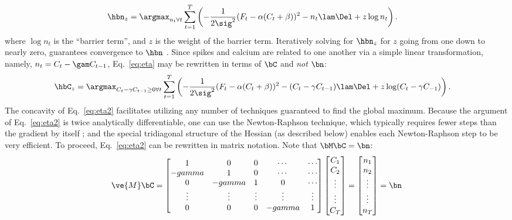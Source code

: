 \begin{align} \label{eq:eta}
\hbn_{\zzz} &= \argmax_{n_t \forall t}  \sum_{t=1}^T \left( -\frac{1}{2 \sig^2}(F_t - \alpha(C_t + \beta))^2  -  n_t  \lam \Del + \zzz \log n_t \right).
\end{align}
\noindent where $\log n_t$ is the ``barrier term'', and $z$ is the weight of the barrier term.  Iteratively solving for $\hbn_{\zzz}$ for $z$ going from one down to nearly zero, guarantees convergence to $\hbn$ \cite{CONV04}. Since spikes and calcium are related to one another via a simple linear transformation, namely, $n_t=C_t-\gam C_{t-1}$, Eq.~\eqref{eq:eta} may be rewritten in terms of $\bC$ and \emph{not} $\bn$:
\begin{align} 
\hbC_{\zzz} &= \argmax_{C_t - \gamma C_{t-1} \geq 0 \forall t} \sum_{t=1}^{T} \left( -\frac{1}{2 \sig^2} (F_t -\alpha (C_t + \beta))^2  - (C_t - \gamma C_{t-1}) \lam \Del + \zzz \log(C_t - \gamma C_{-1}) \right). \label{eq:eta2}
\end{align}
\noindent The concavity of Eq.~\eqref{eq:eta2} facilitates utilizing any number of techniques guaranteed to find the global maximum.  Because the argument of Eq.~\eqref{eq:eta2} is twice analytically differentiable, one can use the Newton-Raphson technique, which typically requires fewer steps than the gradient by itself \cite{CONV04}; and the special tridiagonal structure of the Hessian (as described below) enables each Newton-Raphson step to be very efficient.  To proceed, Eq.~\eqref{eq:eta2} can be rewritten in matrix notation.  Note that $\bM \bC = \bn$:
\begin{align} \label{eq:M}
\ve{M} \bC = %
\begin{bmatrix}
1 & 0  & 0 & \cdots & \cdots \\
-gamma & 1 & 0 & \cdots & \cdots \\
0 & -gamma & 1 & 0 & \cdots  \\
\vdots & \vdots & \vdots & \vdots & \vdots  \\
0 & 0 & 0 & -gamma & 1
\end{bmatrix}
\begin{bmatrix}
C_1 \\ C_2 \\ \vdots \\ \vdots \\ C_T  
\end{bmatrix}
= 
\begin{bmatrix}
n_1 \\ n_2 \\ \vdots \\ \vdots \\ n_T
\end{bmatrix}
= \bn
\end{align}
